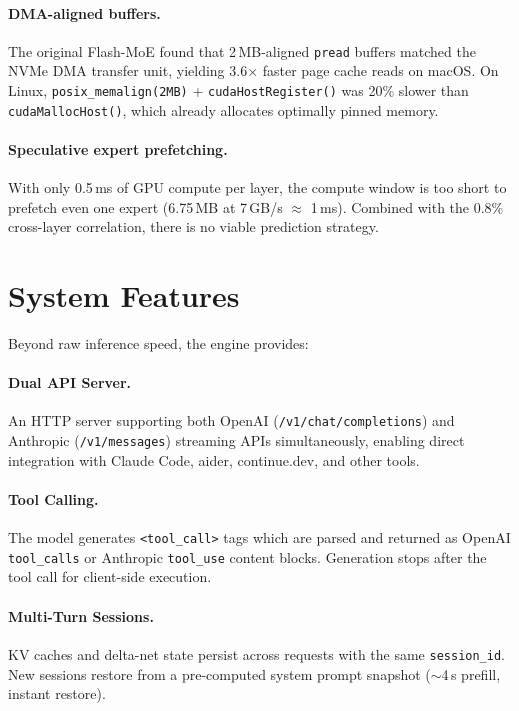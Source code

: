 \documentclass[10pt]{article}
\begin{document}
\paragraph{DMA-aligned buffers.} The original Flash-MoE found that 2\,MB-aligned \texttt{pread} buffers matched the NVMe DMA transfer unit, yielding 3.6$\times$ faster page cache reads on macOS. On Linux, \texttt{posix\_memalign(2MB)} + \texttt{cudaHostRegister()} was 20\% slower than \texttt{cudaMallocHost()}, which already allocates optimally pinned memory.

\paragraph{Speculative expert prefetching.} With only 0.5\,ms of GPU compute per layer, the compute window is too short to prefetch even one expert (6.75\,MB at 7\,GB/s $\approx$ 1\,ms). Combined with the 0.8\% cross-layer correlation, there is no viable prediction strategy.

\section{System Features}

Beyond raw inference speed, the engine provides:

\paragraph{Dual API Server.} An HTTP server supporting both OpenAI (\texttt{/v1/chat/completions}) and Anthropic (\texttt{/v1/messages}) streaming APIs simultaneously, enabling direct integration with Claude Code, aider, continue.dev, and other tools.

\paragraph{Tool Calling.} The model generates \texttt{<tool\_call>} tags which are parsed and returned as OpenAI \texttt{tool\_calls} or Anthropic \texttt{tool\_use} content blocks. Generation stops after the tool call for client-side execution.

\paragraph{Multi-Turn Sessions.} KV caches and delta-net state persist across requests with the same \texttt{session\_id}. New sessions restore from a pre-computed system prompt snapshot ($\sim$4\,s prefill, instant restore).
\end{document}
